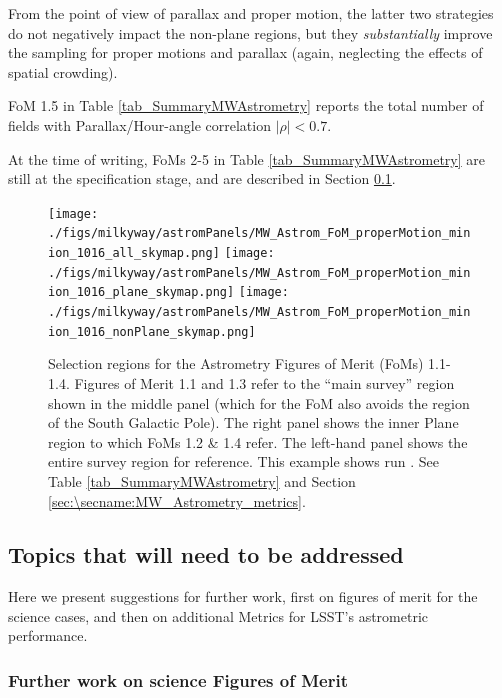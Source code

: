 From the point of view of parallax and proper motion, the latter two
strategies do not negatively impact the non-plane regions, but they
{\it substantially} improve the sampling for proper motions and
parallax (again, neglecting the effects of spatial crowding).

FoM 1.5 in Table \ref{tab_SummaryMWAstrometry} reports the total number of fields with Parallax/Hour-angle correlation $|\rho| < 0.7$.

At the time of writing, FoMs 2-5 in Table
\ref{tab_SummaryMWAstrometry} are still at the specification stage,
and are described in Section
\ref{sec:\secname:MW_Astrometry_furtherwork}.


\begin{figure}[h]
  \begin{center}
    \texttt{[image: ./figs/milkyway/astromPanels/MW\_Astrom\_FoM\_properMotion\_minion\_1016\_all\_skymap.png]}
  \texttt{[image: ./figs/milkyway/astromPanels/MW\_Astrom\_FoM\_properMotion\_minion\_1016\_plane\_skymap.png]}
  \texttt{[image: ./figs/milkyway/astromPanels/MW\_Astrom\_FoM\_properMotion\_minion\_1016\_nonPlane\_skymap.png]}
    \end{center}
  \caption{Selection regions for the Astrometry Figures of Merit (FoMs) 1.1-1.4. Figures of Merit 1.1 and 1.3 refer to the ``main survey'' region shown in the middle panel (which for the FoM also avoids the region of the South Galactic Pole). The right panel shows the inner Plane region to which FoMs 1.2 \& 1.4 refer. The left-hand panel shows the entire survey region for reference. This example shows run . See Table \ref{tab_SummaryMWAstrometry} and Section \ref{sec:\secname:MW_Astrometry_metrics}.}
  \label{fig_astrom_RegionSelKey}
\end{figure}

\subsection{Topics that will need to be addressed}
\label{sec:\secname:MW_Astrometry_furtherwork}

Here we present suggestions for further work, first on figures of
merit for the science cases, and then on additional Metrics for LSST's
astrometric performance.

\subsubsection{Further work on science Figures of Merit}

